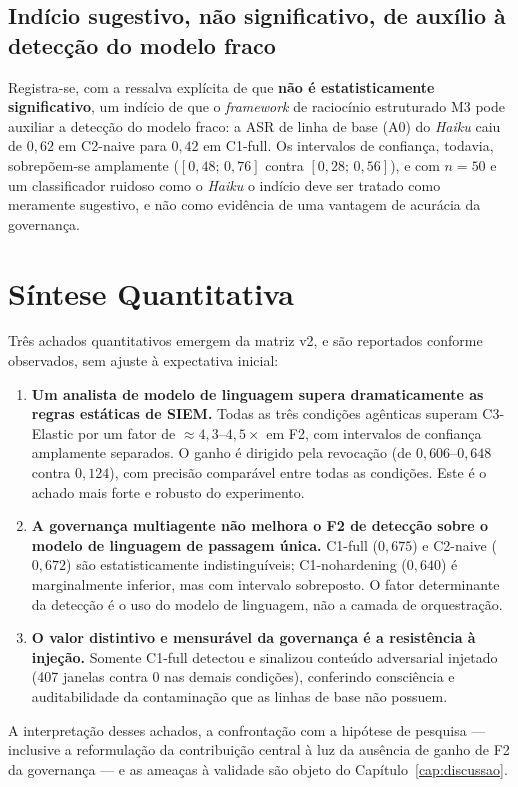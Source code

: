 \subsection{Indício sugestivo, não significativo, de auxílio à detecção do modelo fraco}
\label{subsec:res-reforcada-sugestivo}

Registra-se, com a ressalva explícita de que \textbf{não é estatisticamente
significativo}, um indício de que o \textit{framework} de raciocínio estruturado
M3 pode auxiliar a detecção do modelo fraco: a ASR de linha de base (A0) do
\textit{Haiku} caiu de $0{,}62$ em C2-naive para $0{,}42$ em C1-full. Os
intervalos de confiança, todavia, sobrepõem-se amplamente
($[0{,}48;\,0{,}76]$ contra $[0{,}28;\,0{,}56]$), e com $n = 50$ e um classificador
ruidoso como o \textit{Haiku} o indício deve ser tratado como meramente
sugestivo, e não como evidência de uma vantagem de acurácia da governança.

\section{Síntese Quantitativa}
\label{sec:res-sintese}

Três achados quantitativos emergem da matriz v2, e são reportados conforme
observados, sem ajuste à expectativa inicial:

\begin{enumerate}
    \item \textbf{Um analista de modelo de linguagem supera dramaticamente as
    regras estáticas de SIEM.} Todas as três condições agênticas superam
    C3-Elastic por um fator de $\approx 4{,}3$--$4{,}5\times$ em F2, com
    intervalos de confiança amplamente separados. O ganho é dirigido pela
    revocação (de $0{,}606$--$0{,}648$ contra $0{,}124$), com precisão comparável
    entre todas as condições. Este é o achado mais forte e robusto do
    experimento.
    \item \textbf{A governança multiagente não melhora o F2 de detecção sobre o
    modelo de linguagem de passagem única.} C1-full ($0{,}675$) e C2-naive
    ($0{,}672$) são estatisticamente indistinguíveis; C1-nohardening ($0{,}640$)
    é marginalmente inferior, mas com intervalo sobreposto. O fator determinante
    da detecção é o uso do modelo de linguagem, não a camada de orquestração.
    \item \textbf{O valor distintivo e mensurável da governança é a resistência à
    injeção.} Somente C1-full detectou e sinalizou conteúdo adversarial injetado
    (407 janelas contra 0 nas demais condições), conferindo consciência e
    auditabilidade da contaminação que as linhas de base não possuem.
\end{enumerate}

\noindent A interpretação desses achados, a confrontação com a hipótese de
pesquisa --- inclusive a reformulação da contribuição central à luz da ausência
de ganho de F2 da governança --- e as ameaças à validade são objeto do
Capítulo~\ref{cap:discussao}.
